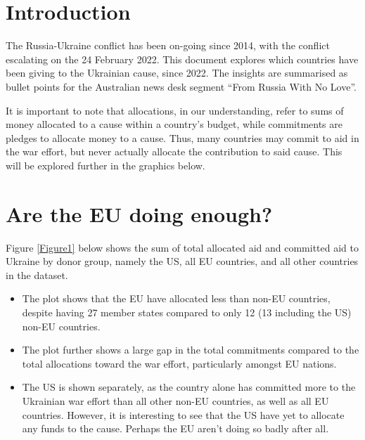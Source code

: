 \documentclass[11pt,preprint, authoryear]{elsarticle}
\numberwithin{equation}{section}
\numberwithin{figure}{section}
\numberwithin{table}{section}
\begin{document}
\headsep 35pt %




\hypertarget{introduction}{%
\section{\texorpdfstring{Introduction
\label{Introduction}}{Introduction }}\label{introduction}}

The Russia-Ukraine conflict has been on-going since 2014, with the
conflict escalating on the 24 February 2022. This document explores
which countries have been giving to the Ukrainian cause, since 2022. The
insights are summarised as bullet points for the Australian news desk
segment ``From Russia With No Love''.

It is important to note that allocations, in our understanding, refer to
sums of money allocated to a cause within a country's budget, while
commitments are pledges to allocate money to a cause. Thus, many
countries may commit to aid in the war effort, but never actually
allocate the contribution to said cause. This will be explored further
in the graphics below.

\hypertarget{are-the-eu-doing-enough}{%
\section{\texorpdfstring{Are the EU doing enough?
\label{EU}}{Are the EU doing enough? }}\label{are-the-eu-doing-enough}}

Figure \ref{Figure1} below shows the sum of total allocated aid and
committed aid to Ukraine by donor group, namely the US, all EU
countries, and all other countries in the dataset.

\begin{itemize}
\item
  The plot shows that the EU have allocated less than non-EU countries,
  despite having 27 member states compared to only 12 (13 including the
  US) non-EU countries.
\item
  The plot further shows a large gap in the total commitments compared
  to the total allocations toward the war effort, particularly amongst
  EU nations.
\item
  The US is shown separately, as the country alone has committed more to
  the Ukrainian war effort than all other non-EU countries, as well as
  all EU countries. However, it is interesting to see that the US have
  yet to allocate any funds to the cause. Perhaps the EU aren't doing so
  badly after all.
\end{itemize}
\end{document}
